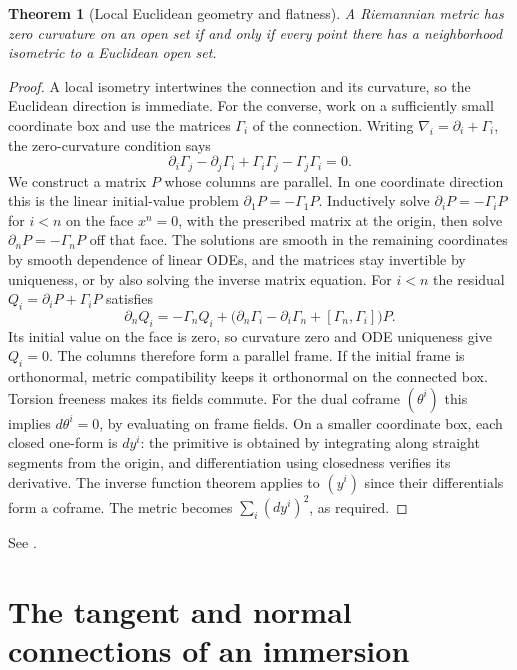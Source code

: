 \documentclass[11pt,oneside,openany]{book}
\theoremstyle{plain}
\newtheorem{theorem}{Theorem}[chapter]
\theoremstyle{definition}
\theoremstyle{remark}
\begin{document}
\begin{theorem}[Local Euclidean geometry and flatness]
\label{thm:p202-flat}
A Riemannian metric has zero curvature on an open set if and only
if every point there has a neighborhood isometric to a Euclidean
open set.
\end{theorem}

\begin{proof}
A local isometry intertwines the connection and its curvature,
so the Euclidean direction is immediate.
For the converse, work on a sufficiently small coordinate box
and use the matrices \(\Gamma_i\) of the connection.
Writing \(\nabla_i=\partial_i+\Gamma_i\), the zero-curvature
condition says
\[
 \partial_i\Gamma_j-\partial_j\Gamma_i+
                    \Gamma_i\Gamma_j-\Gamma_j\Gamma_i=0 .
\]
We construct a matrix \(P\) whose columns are parallel.
In one coordinate direction this is the linear initial-value
problem \(\partial_1P=-\Gamma_1P\).
Inductively solve \(\partial_iP=-\Gamma_iP\) for \(i<n\)
on the face \(x^n=0\), with the prescribed matrix at the origin,
then solve \(\partial_nP=-\Gamma_nP\) off that face.
The solutions are smooth in the remaining coordinates by smooth
dependence of linear ODEs, and the matrices stay invertible by
uniqueness, or by also solving the inverse matrix equation.
For \(i<n\) the residual \(Q_i=\partial_iP+\Gamma_iP\) satisfies
\[
 \partial_n Q_i=-\Gamma_n Q_i+
   \bigl(\partial_n\Gamma_i-\partial_i\Gamma_n+
                           [\Gamma_n,\Gamma_i]\bigr)P .
\]
Its initial value on the face is zero, so curvature zero and ODE
uniqueness give \(Q_i=0\). The columns therefore form a parallel
frame. If the initial frame is orthonormal, metric compatibility
keeps it orthonormal on the connected box. Torsion freeness makes
its fields commute. For the dual coframe \((\theta^i)\) this implies
\(d\theta^i=0\), by evaluating on frame fields.
On a smaller coordinate box, each closed one-form is \(dy^i\):
the primitive is obtained by integrating along straight segments
from the origin, and differentiation using closedness verifies its
derivative. The inverse function theorem applies to \((y^i)\)
since their differentials form a coframe. The metric becomes
\(\sum_i(dy^i)^2\), as required.
\end{proof}

See \cite[Theorems 7.10 and 7.12--7.19]{LeeRM}.

\section{The tangent and normal connections of an immersion}
\label{p202:G14}
\end{document}
